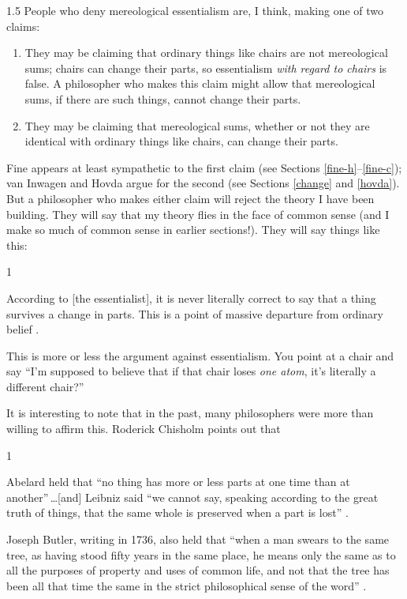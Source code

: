 \documentclass[11pt]{article}
\newenvironment{squote}{%
\begin{spacing}{1}
\begin{list}{}{%
\setlength{\labelwidth}{0pt}%
\rightmargin\leftmargin%
}
\item\relax
}{%
\end{list}%
\end{spacing}
}
\begin{document}
\begin{spacing}{1.5}
People who deny mereological essentialism are, I think, making one of
two claims:

\begin{enumerate}
  \item They may be claiming that ordinary things like chairs are not
    mereological sums; chairs can change their parts, so essentialism
    {\em with regard to chairs} is false.  A philosopher who makes
    this claim might allow that mereological sums, if there are such
    things, cannot change their parts.
  \item They may be claiming that mereological sums, whether or not
    they are identical with ordinary things like chairs, can change
    their parts.
\end{enumerate}

Fine appears at least sympathetic to the first claim (see Sections
\ref{fine-h}--\ref{fine-c}); van Inwagen and Hovda argue for the
second (see Sections \ref{change} and \ref{hovda}).  But a philosopher
who makes either claim will reject the theory I have been building.
They will say that my theory flies in the face of common sense (and I
make so much of common sense in earlier sections!).  They will say
things like this:

\begin{squote}
According to [the essentialist], it is never literally correct to say
that a thing survives a change in parts.  This is a point of massive
departure from ordinary belief \citep[184]{sider2001}.
\end{squote}

This is more or less the argument against essentialism.  You point at
a chair and say ``I'm supposed to believe that if that chair loses
{\em one atom}, it's literally a different chair?''

It is interesting to note that in the past, many philosophers were
more than willing to affirm this.  Roderick Chisholm points out that

\begin{squote}
Abelard held that ``no thing has more or less parts at one time than
at another''\,\ldots [and] Leibniz said ``we cannot say, speaking
according to the great truth of things, that the same whole is
preserved when a part is lost'' \citeyearpar[145]{chisholm1979}.
\end{squote}

Joseph Butler, writing in 1736, also held that ``when a man swears to
the same tree, as having stood fifty years in the same place, he means
only the same as to all the purposes of property and uses of common
life, and not that the tree has been all that time the same in the
strict philosophical sense of the word''
\citeyearpar[100]{butler1975a}.


\end{spacing}
\end{document}
